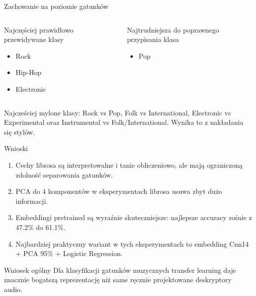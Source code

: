 \documentclass[aspectratio=1610,polish]{beamer}
\begin{document}
\begin{frame}{Zachowanie na poziomie gatunków}
	\begin{columns}
		\begin{block}{Najczęściej prawidłowo przewidywane klasy}
			\begin{itemize}
				\item Rock
				\item Hip-Hop
				\item Electronic
			\end{itemize}
		\end{block}

		\begin{alertblock}{Najtrudniejsza do poprawnego przypisania klasa}
			\begin{itemize}
				\item Pop
			\end{itemize}
		\end{alertblock}
	\end{columns}

	\vspace{0.8em}
	Najcześciej mylone klasy: Rock vs Pop, Folk vs International, Electronic vs Experimental oraz Instrumental vs Folk/International. Wynika to z nakładania się stylów.
\end{frame}

\begin{frame}{Wnioski}
	\begin{enumerate}
		\item Cechy librosa są interpretowalne i tanie obliczeniowo, ale mają ograniczoną zdolność separowania gatunków.
		\item PCA do 4 komponentów w eksperymentach librosa usuwa zbyt dużo informacji.
		\item Embeddingi pretrained są wyraźnie skuteczniejsze: najlepsze accuracy rośnie z 47.2\% do 61.1\%.
		\item Najbardziej praktyczny wariant w tych eksperymentach to embedding Cnn14 + PCA 95\% + Logistic Regression.
	\end{enumerate}

	\begin{block}{Wniosek ogólny}
		Dla klasyfikacji gatunków muzycznych transfer learning daje znacznie bogatszą reprezentację niż same ręcznie projektowane deskryptory audio.
	\end{block}
\end{frame}
\end{document}
